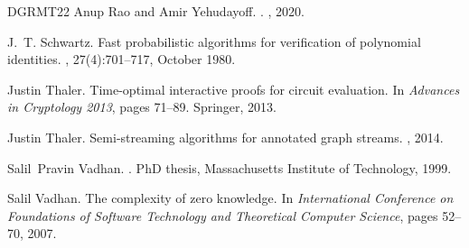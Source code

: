 \documentclass[10pt,a4paper]{article}
\theoremstyle{definition}
\begin{document}
\begin{thebibliography}{DGRMT22}
Anup Rao and Amir Yehudayoff.
.
, 2020.

J.~T. Schwartz.
\newblock Fast probabilistic algorithms for verification of polynomial identities.
, 27(4):701--717, October 1980.

Justin Thaler.
\newblock Time-optimal interactive proofs for circuit evaluation.
\newblock In {\em Advances in {{Cryptology}} 2013}, pages 71--89. {Springer}, 2013.

Justin Thaler.
\newblock Semi-streaming algorithms for annotated graph streams.
, 2014.

Salil~Pravin Vadhan.
.
\newblock PhD thesis, Massachusetts Institute of Technology, 1999.

Salil Vadhan.
\newblock The complexity of zero knowledge.
\newblock In {\em International Conference on Foundations of Software Technology and Theoretical Computer Science}, pages 52--70, 2007.

\end{thebibliography}
\end{document}

